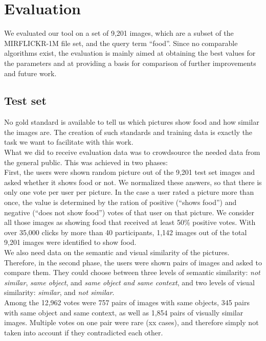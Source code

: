 %
\section{Evaluation}
\label{sec_evaluation}

We evaluated our tool on a set of 9,201 images, which are a subset of the MIRFLICKR-1M  file set, and the query term ``food''. Since no comparable algorithms exist, the evaluation is mainly aimed at obtaining the best values for the parameters and at providing a basis for comparison of further improvements and future work.

\subsection{Test set}
\label{sec_testset}
No gold standard is available to tell us which pictures show food and how similar the images are. The creation of such standards and training data is exactly the task we want to facilitate with this work.\\ 
What we did to receive evaluation data was to crowdsource the needed data from the general public. This was achieved in two phases:\\

First, the users were shown random picture out of the 9,201 test set images and asked whether it shows food or not. We normalized these answers, so that there is only one vote per user per picture. In the case a user rated a picture more than once, the value is determined by the ration of positive (``shows food'') and negative (``does not show food'') votes of that user on that picture. We consider all those images as showing food that received at least 50\% positive votes. With over 35,000 clicks by more than 40 participants, 1,142 images out of the total 9,201 images were identified to show food. \\

We also need data on the semantic and visual similarity of the pictures. Therefore, in the second phase, the users were shown pairs of images and asked to compare them. They could choose between three levels of semantic similarity: \emph{not similar}, \emph{same object}, and \emph{same object and same context}, and two levels of visual similarity: \emph{similar}, and \emph{not similar}.\\
Among the 12,962 votes were 757 pairs of images with same objects, 345 pairs with same object and same context, as well as 1,854 pairs of visually similar images. Multiple votes on one pair were rare (xx cases), and therefore simply not taken into account if they contradicted each other.

